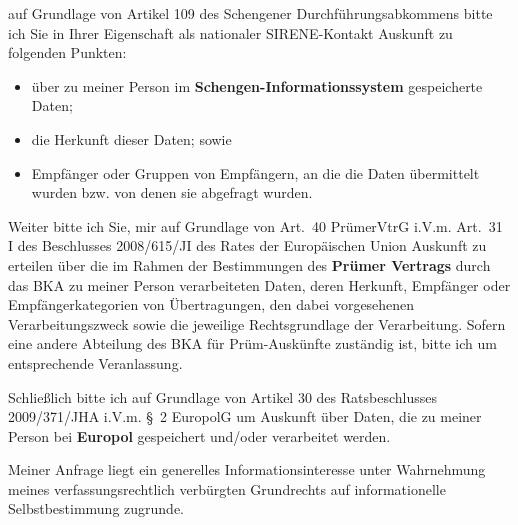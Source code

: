 auf Grundlage von Artikel 109 des Schengener Durchführungsabkommens bitte ich Sie
in Ihrer Eigenschaft als nationaler SIRENE-Kontakt Auskunft zu folgenden Punkten:

\begin{itemize}
  \item über zu meiner Person im \textbf{Schengen-Informationssystem} gespeicherte Daten;

  \item die Herkunft dieser Daten; sowie

  \item Empfänger oder Gruppen von Empfängern, an die die Daten übermittelt wurden
  bzw. von denen sie abgefragt wurden.
\end{itemize}

Weiter bitte ich Sie, mir auf Grundlage von Art.~40 PrümerVtrG i.V.m.
Art.~31 I des Beschlusses 2008/615/JI des Rates der Europäischen Union Auskunft
zu erteilen über die im Rahmen der Bestimmungen des \textbf{Prümer Vertrags} durch
das BKA zu meiner Person verarbeiteten Daten, deren Herkunft, Empfänger oder
Empfängerkategorien von Übertragungen, den dabei vorgesehenen Verarbeitungszweck
sowie die jeweilige Rechtsgrundlage der Verarbeitung. Sofern eine andere Abteilung
des BKA für Prüm-Auskünfte zuständig ist, bitte ich um entsprechende Veranlassung.

Schließlich bitte ich auf Grundlage von Artikel 30 des Ratsbeschlusses
2009/371/JHA i.V.m. §~2 EuropolG um Auskunft über Daten, die zu
meiner Person bei \textbf{Europol} gespeichert und/oder verarbeitet werden.

Meiner Anfrage liegt ein generelles Informationsinteresse unter Wahrnehmung
meines verfassungsrechtlich verbürgten Grundrechts auf informationelle
Selbstbestimmung zugrunde.
